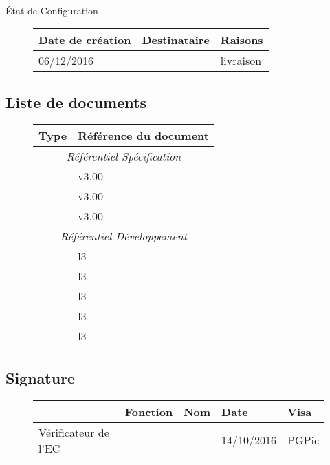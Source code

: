 \documentclass[asi, sansVersion]{picInsa}
\begin{document}
\begin{center}
\huge
\nomEquipe{}\\
État de Configuration\\
\end{center}
\vspace{0.5cm}


\begin{figure}[H]
		\centering
		\begin{tabularx}{17cm}{|p{4cm}|X|X|}
		\hline
		\rowcolor[gray]{0.85}Date de création & Destinataire & Raisons \\
		\hline
		06/12/2016 & \client & livraison \\
		\hline
		\end{tabularx}
\end{figure}

\subsection*{Liste de documents}

\begin{figure}[H]
		\centering
		\begin{tabularx}{17cm}{|p{7cm}|X|}
		\hline
		\rowcolor[gray]{0.85}Type & Référence du document\\
		\hline
		\multicolumn{2}{|c|}{\textit{Référentiel Spécification}}\\
		\hline 
		 \DSE & v3.00  \\
		 \DSI & v3.00  \\
		 \PTV & v3.00  \\		 	 
		\hline 
		\multicolumn{2}{|c|}{\textit{Référentiel Développement}}\\
		\hline
		 \PTU & l3 \\
		 \JTU & l3 \\
		 \PTI & l3 \\
		 \JTI & l3 \\
		 \DCP & l3 \\		 	 		 		 		 
		\hline 
		\end{tabularx}
\end{figure}

\subsection*{Signature}

\begin{figure}[H]
		\centering
		\begin{tabularx}{17cm}{|p{4cm}|X|X|X|X|}
		\hline
		\rowcolor[gray]{0.85}& Fonction & Nom & Date & Visa \\
		\hline
		 Vérificateur de l'EC & \RGC & \Melissa & 14/10/2016 & PGPic \\
		\hline
		\end{tabularx}
\end{figure}
\end{document}
